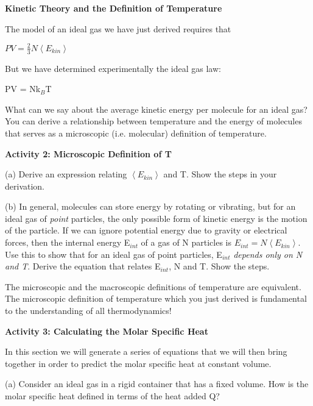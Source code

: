 \textbf{Kinetic Theory and the Definition of Temperature}

The model of an ideal gas we have just derived requires that

{\centering \( PV=\frac{2}{3}N\left\langle E_{kin}\right\rangle  \)\par}

But we have determined experimentally the ideal gas law:

{\centering PV = Nk\( _{B} \)T\par}

What can we say about the average kinetic energy per molecule for
an ideal gas? You can derive a relationship between temperature and
the energy of molecules that serves as a microscopic (i.e. molecular)
definition of temperature.

\textbf{Activity 2: Microscopic Definition of T}

(a) Derive an expression relating \( \left\langle E_{kin}\right\rangle  \)
and T. Show the steps in your derivation.
\vspace{1.5in}

(b) In general, molecules can store energy by rotating or vibrating,
but for an ideal gas of \emph{point} particles, the only possible
form of kinetic energy is the motion of the particle. If we can ignore
potential energy due to gravity or electrical forces, then the internal
energy E\( _{int} \) of a gas of N particles is \( E_{int}=N\left\langle E_{kin}\right\rangle  \).
Use this to show that for an ideal gas of point particles, E\( _{int} \)
\emph{depends only on N and T}. Derive the equation that relates E\( _{int} \),
N and T. Show the steps.
\vspace{1.5in}

The microscopic and the macroscopic definitions of temperature are
equivalent. The microscopic definition of temperature which you just
derived is fundamental to the understanding of all thermodynamics!

\textbf{Activity 3: Calculating the Molar Specific Heat}

In this section we will generate a series of equations that we will
then bring together in order to predict the molar specific heat at
constant volume.
\vspace{1in}

(a) Consider an ideal gas in a rigid container that has a fixed volume.
How is the molar specific heat defined in terms of the heat added
Q?
\vspace{1in}

